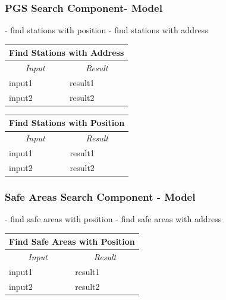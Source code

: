 \documentclass[english]{article}
\begin{document}
\subsubsection{PGS Search Component- Model}
- find stations with position
- find stations with address

\begin{center}
	\begin{tabular}{ | m{6cm} | m{6cm} | }
		\hline
		\multicolumn{2}{|c|}{\textbf{Find Stations with Address}} \\
		\hline
		\multicolumn{1}{|c|}{\textit{Input}} & \multicolumn{1}{c|}{\textit{Result}} \\
		\hline
		input1 & result1 \\
		\hline
		input2 & result2 \\
		\hline
	\end{tabular}
\end{center}

\begin{center}
	\begin{tabular}{ | m{6cm} | m{6cm} | }
		\hline
		\multicolumn{2}{|c|}{\textbf{Find Stations with Position}} \\
		\hline
		\multicolumn{1}{|c|}{\textit{Input}} & \multicolumn{1}{c|}{\textit{Result}} \\
		\hline
		input1 & result1 \\
		\hline
		input2 & result2 \\
		\hline
	\end{tabular}
\end{center}

\subsubsection{Safe Areas Search Component - Model}
- find safe areas with position
- find safe areas with address

\begin{center}
	\begin{tabular}{ | m{6cm} | m{6cm} | }
		\hline
		\multicolumn{2}{|c|}{\textbf{Find Safe Areas with Position}} \\
		\hline
		\multicolumn{1}{|c|}{\textit{Input}} & \multicolumn{1}{c|}{\textit{Result}} \\
		\hline
		input1 & result1 \\
		\hline
		input2 & result2 \\
		\hline
	\end{tabular}
\end{center}
\end{document}
